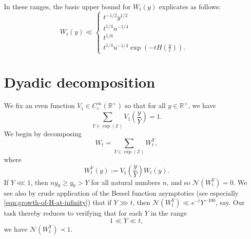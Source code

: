 \documentclass[reqno]{amsart} 
\begin{document}
In these ranges, the basic upper bound for $W_t(y)$ explicates as follows:
\begin{equation*}
  W _t (y) \ll
  \begin{cases}
    t ^{- 1/2} y ^{1/2}  &  \\
    t ^{1/4} u ^{- 1/4}         &  \\
    t ^{1/6}                        &  \\
    t ^{1/4} u ^{- 1/4} \exp (- t H (\tfrac{y}{t})).                         &
  \end{cases}
\end{equation*}

\section{Dyadic decomposition}
We fix an even function $V_1 \in C_c^\infty(\mathbb{R}^\times)$ so that for all $y \in \mathbb{R}^\times$, we have
\begin{equation*}
  \sum _{Y \in \exp(\mathbb{Z})} V_1\left(\frac{y}{Y}\right) = 1. 
\end{equation*}
We begin by decomposing
\begin{equation*}
  W_t = \sum _{Y \in \exp(\mathbb{Z})} W_t^Y,
\end{equation*}
where
\begin{equation*}
  W_t^Y(y) := V_1\left(\frac{y}{Y}\right) W_t(y).
\end{equation*}
If $Y \lll 1$, then $n y_0  \geq y_0> Y$ for all natural numbers $n$, and so $\mathcal{N}(W_t^Y) = 0$.  We see also by crude application of the Bessel function asymptotics (see especially \eqref{eqn:growth-of-H-at-infinity}) that if $Y \ggg t$, then $\mathcal{N}(W_t^Y) \ll e^{-t} Y^{-100}$, say.  Our task thereby reduces to verifying that for each $Y$ in the range
\begin{equation}\label{eqn:Y-between-1-and-t}
  1 \ll Y \ll t,
\end{equation}
we have $\mathcal{N}(W_t^Y) \prec 1$.
\end{document}
